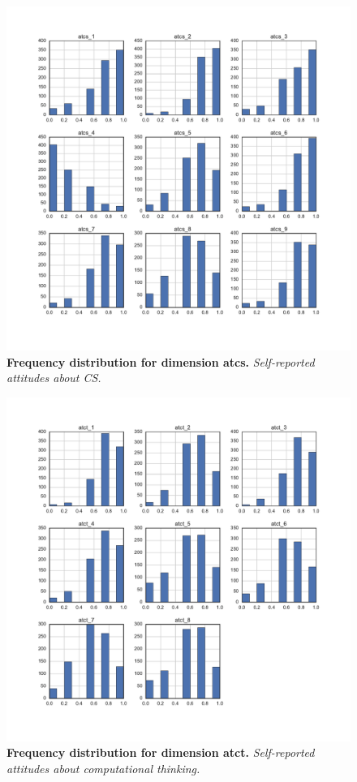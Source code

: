 \begin{figure}[!hbtp]
\centering
    \caption{\textbf{Frequency distribution for dimension atcs. }\textit{Self-reported attitudes about CS.}}\label{atcs_dimension}
    \includegraphics[width=1\textwidth]{figures/atcs_dimension}
\end{figure}

\begin{figure}[!hbtp]
\centering
    \caption{\textbf{Frequency distribution for dimension atct. }\textit{Self-reported attitudes about computational thinking.}}\label{atct_dimension}
    \includegraphics[width=1\textwidth]{figures/atct_dimension}
\end{figure}

